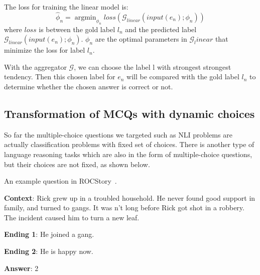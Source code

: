  
 The loss for training the linear model is:
 \begin{equation}
  \hat{\phi}_{n} = \mathop{\arg\min}_{\phi_n}{loss({\mathcal{G}_{linear}(input(e_n);\phi_n)})}
\end{equation}
where $loss$ is between the
gold label $l_n$ and the predicted label $\mathcal{G}_{linear}(input(e_n);\phi_n)$.
$\phi_n$ are the optimal
parameters in $\mathcal{G}_linear$
that minimize the loss
for label $l_n$. 

With the aggregator $\mathcal{G}$, we can choose the 
label l with strongest strongest tendency. 
Then this chosen label for $e_n$ will be compared with the gold label $l_n$ to
 determine whether the chosen answer is correct or not.

\subsection{Transformation of MCQs with dynamic choices}
\label{sec:dynamic}
So far the multiple-choice questions we targeted such as NLI problems
are actually classification problems with fixed set of choices. There is
another type of language reasoning tasks which are also in the form of
multiple-choice questions, but their choices are not fixed, as shown
below. 
\begin{example}\label{exp:roc}
An example question in ROCStory~\cite{mostafazadeh2016corpus}.

\noindent
\textbf{Context}: Rick grew up in a troubled household. 
He never found good support in family, and turned to gangs.           
It was n't long before Rick got shot in a robbery.             
The incident caused him to turn a new leaf.

\noindent
\textbf{Ending 1}: He joined a gang. 

\noindent
\textbf{Ending 2}:  He is happy now.

\noindent
\textbf{Answer}: 2
\end{example}

